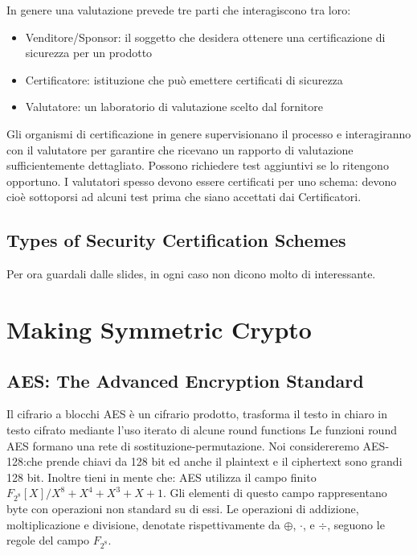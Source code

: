 \documentclass[11pt]{article}
\theoremstyle{definition} \newtheorem{definizione}{Definizione}[section] %
\begin{document}
    In genere una valutazione prevede tre parti che interagiscono tra loro:
    \begin{itemize}
        \item Venditore/Sponsor: il soggetto che desidera ottenere una certificazione di sicurezza per un prodotto
        \item Certificatore: istituzione che può emettere certificati di sicurezza
        \item Valutatore: un laboratorio di valutazione scelto dal fornitore
    \end{itemize}

    Gli organismi di certificazione in genere supervisionano il processo e interagiranno con il valutatore per garantire che ricevano un rapporto di valutazione sufficientemente dettagliato. Possono richiedere test aggiuntivi se lo ritengono opportuno.
    I valutatori spesso devono essere certificati per uno schema: devono cioè sottoporsi ad alcuni test
    prima che siano accettati dai Certificatori.

    \subsection{Types of Security Certification Schemes}
        Per ora guardali dalle slides, in ogni caso non dicono molto di interessante.
    
\section{Making Symmetric Crypto}
    \subsection{AES: The Advanced Encryption Standard}
    Il cifrario a blocchi AES è un cifrario prodotto, trasforma il testo in chiaro in testo cifrato mediante l'uso iterato di alcune round functions
    Le funzioni round AES formano una rete di sostituzione-permutazione.   
    Noi considereremo AES-128:che prende chiavi da 128 bit ed anche il plaintext e il ciphertext sono grandi 128 bit.
    Inoltre tieni in mente che: AES utilizza il campo finito $F_{2^8}[X]/X^8 + X^4 + X^3 + X + 1$. Gli elementi di questo campo rappresentano byte con operazioni non standard su di essi. Le operazioni di addizione, moltiplicazione e divisione, denotate rispettivamente da $\oplus$, $\cdot$, e $\div$, seguono le regole del campo $F_{2^8}$.
\end{document}
